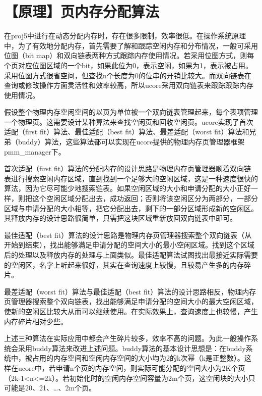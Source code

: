 \section{【原理】页内存分配算法}\label{ux539fux7406ux9875ux5185ux5b58ux5206ux914dux7b97ux6cd5}

在proj5中进行在动态分配内存时，存在很多限制，效率很低。在操作系统原理中，为了有效地分配内存，首先需要了解和跟踪空闲内存和分布情况，一般可采用位图（bit
map）和双向链表两种方式跟踪内存使用情况。若采用位图方式，则每个页对应位图区域的一个bit，如果此位为0，表示空闲，如果为1，表示被占用。采用位图方式很省空间，但查找n个长度为0的位串的开销比较大。而双向链表在查询或修改操作方面灵活性和效率较高，所以ucore采用双向链表来跟踪跟踪内存使用情况。

假设整个物理内存空闲空间的以页为单位被一个双向链表管理起来，每个表项管理一个物理页。这需要设计某种算法来查找空闲页和回收空闲页。ucore实现了首次适配（first
fit）算法、最佳适配（best fit）算法、最差适配（worst
fit）算法和兄弟（buddy）算法，这些算法都可以实现在ucore提供的物理内存页管理器框架pmm\_manager下。

首次适配（first
fit）算法的分配内存的设计思路是物理内存页管理器顺着双向链表进行搜索空闲内存区域，直到找到一个足够大的空闲区域，这是一种速度很快的算法，因为它尽可能少地搜索链表。如果空闲区域的大小和申请分配的大小正好一样，则把这个空闲区域分配出去，成功返回；否则将该空闲区分为两部分，一部分区域与申请分配的大小相等，把它分配出去，剩下的一部分区域形成新的空闲区。其释放内存的设计思路很简单，只需把这块区域重新放回双向链表中即可。

最佳适配（best
fit）算法的设计思路是物理内存页管理器搜索整个双向链表（从开始到结束），找出能够满足申请分配的空间大小的最小空闲区域。找到这个区域后的处理以及释放内存的处理与上面类似。最佳适配算法试图找出最接近实际需要的空闲区，名字上听起来很好，其实在查询速度上较慢，且较易产生多的内存碎片。

最差适配（worst fit）算法与最佳适配（best
fit）算法的设计思路相反，物理内存页管理器搜索整个双向链表，找出能够满足申请分配的空间大小的最大空闲区域，使新的空闲区比较大从而可以继续使用。在实际效果上，查询速度上也较慢，产生内存碎片相对少些。

上述三种算法在实际应用中都会产生碎片较多，效率不高的问题。为此一般操作系统会采用buddy算法来改进上述问题。buddy算法的基本设计思想是：在buddy系统中，被占用的内存空间和空闲内存空间的大小均为2的k次幂（k是正整数）。这样在ucore中，若申请n个页的内存空间，则实际可能分配的空间大小为2K个页（2k-1\textless{}n\textless{}=2k）。若初始化时的空闲内存空间容量为2m个页，这空闲块的大小只可能是20、21、\ldots{}、2m个页。

